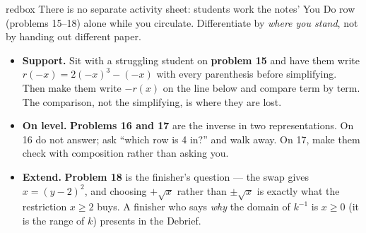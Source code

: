 \documentclass[10pt]{article}
\begin{document}
\begin{skillbox}{redbox}
There is no separate activity sheet: students work the notes' You Do row (problems 15--18)
alone while you circulate. Differentiate by \textit{where you stand}, not by handing out
different paper.

\begin{itemize}
  \item \textbf{Support.} Sit with a struggling student on \textbf{problem 15} and have them
        write $r(-x) = 2(-x)^3 - (-x)$ with every parenthesis before simplifying. Then make
        them write $-r(x)$ on the line below and compare term by term. The comparison, not
        the simplifying, is where they are lost.
  \item \textbf{On level.} \textbf{Problems 16 and 17} are the inverse in two representations.
        On 16 do not answer; ask ``which row is 4 in?'' and walk away. On 17, make them check
        with composition rather than asking you.
  \item \textbf{Extend.} \textbf{Problem 18} is the finisher's question --- the swap gives
        $x = (y - 2)^2$, and choosing $+\sqrt{x}$ rather than $\pm\sqrt{x}$ is exactly what the
        restriction $x \ge 2$ buys. A finisher who says \textit{why} the domain of $k^{-1}$ is
        $x \ge 0$ (it is the range of $k$) presents in the Debrief.
\end{itemize}
\end{skillbox}
\end{document}
